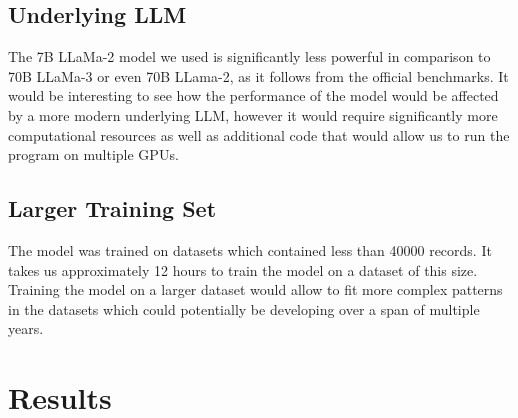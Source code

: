 \subsection{Underlying LLM}
The 7B LLaMa-2 model we used is significantly less powerful in comparison to 70B LLaMa-3 or even 70B LLama-2, as it follows from the official benchmarks. It would be interesting to see how the performance of the model would be affected by a more modern underlying LLM, however it would require significantly more computational resources as well as additional code that would allow us to run the program on multiple GPUs.

\subsection{Larger Training Set}
The model was trained on datasets which contained less than 40000 records. It takes us approximately 12 hours to train the model on a dataset of this size. Training the model on a larger dataset would allow to fit more complex patterns in the datasets which could potentially be developing over a span of multiple years.
\section{Results}

